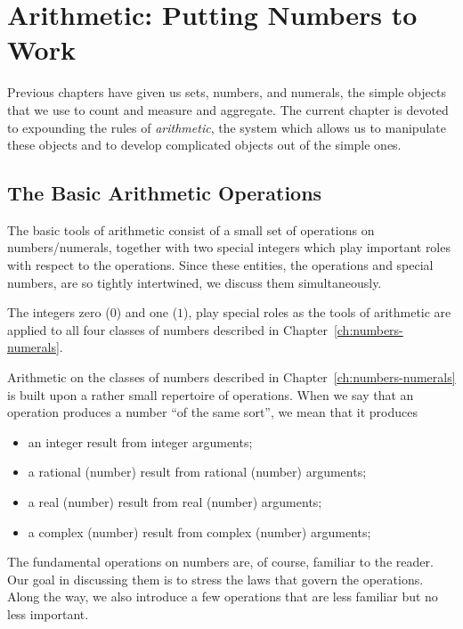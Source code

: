 
\chapter{Arithmetic: Putting Numbers to Work}
\label{ch:arithmetic}



\noindent
Previous chapters have given us sets, numbers, and numerals, the simple objects that we use to count and measure and aggregate.  The current chapter is devoted to expounding the rules of {\em arithmetic}, the system which allows us to manipulate these objects and to develop complicated objects out of the simple ones.

\section{The Basic Arithmetic Operations}
\label{sec:Arithmetic-Tools}

The basic tools of arithmetic consist of a small set of operations on numbers/numerals, together with two special integers which play important roles with respect to the operations.  Since these entities, the operations and special numbers, are so tightly intertwined, we discuss them simultaneously.

\smallskip



The integers zero ($0$)  and one ($1$), play special roles as the tools of arithmetic are applied to all four classes of numbers described in Chapter~\ref{ch:numbers-numerals}.

\smallskip


Arithmetic on the classes of numbers described in Chapter~\ref{ch:numbers-numerals} is built upon a rather small repertoire of operations.  When we say that an operation produces a number ``of the same sort'', we mean that it produces
\begin{itemize}
\item
an integer result from integer arguments;
\item
a rational (number) result from rational (number) arguments;
\item
a real (number) result from real (number) arguments;
\item
a complex (number) result from complex (number) arguments;
\end{itemize}
The fundamental operations on numbers are, of course, familiar to the reader.  Our goal in discussing them is to stress the laws that govern the operations.  Along the way, we also introduce a few operations that are less familiar but no less important.

